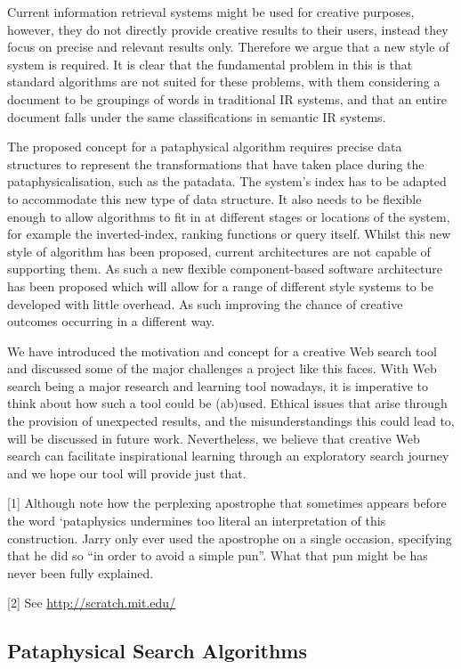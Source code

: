 Current information retrieval systems might be used for creative purposes, however, they do not directly provide creative results to their users, instead they focus on precise and relevant results only. Therefore we argue that a new style of system is required. It is clear that the fundamental problem in this is that standard algorithms are not suited for these problems, with them considering a document to be groupings of words in traditional IR systems, and that an entire document falls under the same classifications in semantic IR systems.

The proposed concept for a pataphysical algorithm requires precise data structures to represent the transformations that have taken place during the pataphysicalisation, such as the patadata. The system’s index has to be adapted to accommodate this new type of data structure. It also needs to be flexible enough to allow algorithms to fit in at different stages or locations of the system, for example the inverted-index, ranking functions or query itself.
Whilst this new style of algorithm has been proposed, current architectures are not capable of supporting them. As such a new flexible component-based software architecture has been proposed which will allow for a range of different style systems to be developed with little overhead. As such improving the chance of creative outcomes occurring in a different way.

We have introduced the motivation and concept for a creative Web search tool and discussed some of the major challenges a project like this faces. With Web search being a major research and learning tool nowadays, it is imperative to think about how such a tool could be (ab)used. Ethical issues that arise through the provision of unexpected results, and the misunderstandings this could lead to, will be discussed in future work. Nevertheless, we believe that creative Web search can facilitate inspirational learning through an exploratory search journey and we hope our tool will provide just that.

[1] Although note how the perplexing apostrophe that sometimes appears before the word ‘pataphysics undermines too literal an interpretation of this construction. Jarry only ever used the apostrophe on a single occasion, specifying that he did so “in order to avoid a simple pun”. What that pun might be has never been fully explained.

[2] See \url{http://scratch.mit.edu/}

\subsection{Pataphysical Search Algorithms}

